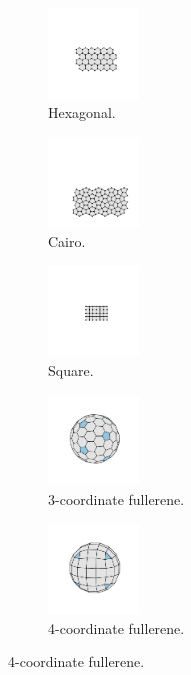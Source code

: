 \begin{figure}[h]
     \centering
     
     \begin{subfigure}[b]{0.3\textwidth}
         \centering
         \includegraphics[height=2.4cm]{./figures/methods/hex.pdf}
         \caption{Hexagonal.}
         \label{fig:latticeshex}
     \end{subfigure}
     \hfill
     \begin{subfigure}[b]{0.3\textwidth}
         \centering
         \includegraphics[height=2.4cm]{./figures/methods/cai.pdf}
         \caption{Cairo.}
         \label{fig:latticescairo}
     \end{subfigure}
     \hfill
	\begin{subfigure}[b]{0.3\textwidth}
         \centering
         \includegraphics[height=2.4cm]{./figures/methods/sq.pdf}
         \caption{Square.}
         \label{fig:latticessq}
     \end{subfigure}
     \hfill
     \vspace{0.5cm}
     
       \begin{subfigure}[b]{0.45\textwidth}
         \centering
         \includegraphics[height=2.4cm]{./figures/methods/full92.pdf}
         \caption{3\--coordinate fullerene.}
         \label{fig:latticesfull92}
     \end{subfigure}
     \hspace{1cm}
     \begin{subfigure}[b]{0.45\textwidth}
         \centering
         \includegraphics[height=2.4cm]{./figures/methods/full98.pdf}
         \caption{4\--coordinate fullerene.}
         \label{fig:latticesfull98}
     \end{subfigure}
     

\end{figure}
